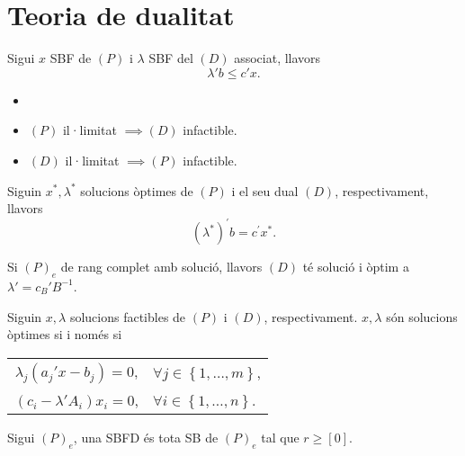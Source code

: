 \chapter{Teoria de dualitat}

\begin{teo}
    Sigui $x$ SBF de $\left(P\right)$ i $\lambda$ SBF del $\left(D\right)$ associat, llavors
    \[ \lambda' b\leq c'x. \]
\end{teo}
\begin{col}
    \begin{itemize}
        \item[]
        \item $\left(P\right)$ il·limitat $\implies \left(D\right)$ infactible.
        \item $\left(D\right)$ il·limitat $\implies \left(P\right)$ infactible.
    \end{itemize}
\end{col}
\begin{teo}
    Siguin $x^*, \lambda^*$ solucions òptimes de $\left(P\right)$ i el seu dual $\left(D\right)$, respectivament, llavors
    \[ \left(\lambda^*\right)^\prime b = c^\prime x^*.\]
\end{teo}
\begin{col}
    Si $\left(P\right)_e$ de rang complet amb solució, llavors $\left(D\right)$ té solució i òptim a $\lambda' = c_B'B^{-1}$.
\end{col}
\begin{teo}
    Siguin $x, \lambda$ solucions factibles de $\left(P\right)$ i $\left(D\right)$, respectivament. $x, \lambda$ són solucions òptimes si i només si
    \begin{center}
        \begin{tabular}{cl}
            $\lambda_j \left(a_j'x - b_j\right) = 0$, & $\forall j \in \left\{1, \dots, m\right\}$, \\
            $\left(c_i - \lambda'A_i\right) x_i = 0$, & $\forall i \in \left\{1, \dots, n\right\}$.
        \end{tabular}
    \end{center}
\end{teo}
\begin{defi}
    Sigui $\left(P\right)_e$, una SBFD és tota SB de $\left(P\right)_e$ tal que $r \geq \left[0\right]$.
\end{defi}
